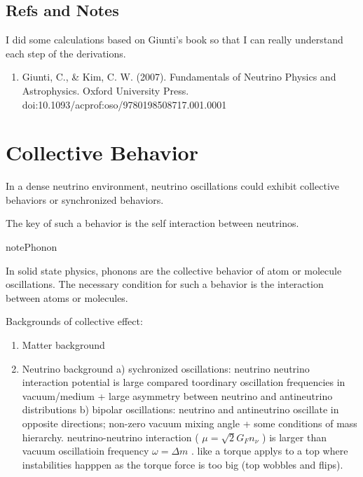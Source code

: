 \documentclass[letterpaper,12pt,english]{sphinxmanual}
\begin{document}
\section{Refs and Notes}
\label{parametric:refs-and-notes}
I did some calculations based on Giunti's book so that I can really understand each step of the derivations.
\begin{enumerate}
\item {} 
Giunti, C., \& Kim, C. W. (2007). Fundamentals of Neutrino Physics and Astrophysics. Oxford University Press. doi:10.1093/acprof:oso/9780198508717.001.0001

\end{enumerate}


\chapter{Collective Behavior}
\label{collective:collective-behavior}\label{collective::doc}
In a dense neutrino environment, neutrino oscillations could exhibit collective behaviors or synchronized behaviors.

The key of such a behavior is the self interaction between neutrinos.

\begin{notice}{note}{Phonon}

In solid state physics, phonons are the collective behavior of atom or molecule oscillations. The necessary condition for such a behavior is the interaction between atoms or molecules.
\end{notice}

Backgrounds of collective effect:
\begin{enumerate}
\item {} 
Matter background

\item {} 
Neutrino background
a) sychronized oscillations: neutrino neutrino interaction potential is large compared toordinary oscillation frequencies in vacuum/medium + large asymmetry between neutrino and antineutrino distributions
b) bipolar oscillations: neutrino and antineutrino oscillate in opposite directions; non-zero vacuum mixing angle + some conditions of mass hierarchy. neutrino-neutrino interaction ( \(\mu=\sqrt{2}G_F n_\nu\) ) is larger than vacuum oscillatioin frequency \(\omega=\Delta m\) . like a torque applys to a top where instabilities happpen as the torque force is too big (top wobbles and flips).

\end{enumerate}
\end{document}
